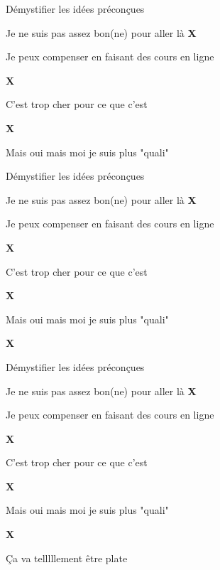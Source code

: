 \documentclass{beamer}
\begin{document}
\begin{frame}{Démystifier les idées préconçues}
\begin{itemize}
    \item Je ne suis pas assez bon(ne) pour aller là \Large{\textbf{\color{red}X}}
    \normalsize{\item Je peux compenser en faisant des cours en ligne} \Large{\textbf{\color{red}X}}
    \normalsize{\item C'est trop cher pour ce que c'est} \Large{\textbf{\color{red}X}}
    \normalsize{\item Mais oui mais moi je suis plus "quali"} %
\end{itemize}
\end{frame}

\begin{frame}{Démystifier les idées préconçues}
\begin{itemize}
    \item Je ne suis pas assez bon(ne) pour aller là \Large{\textbf{\color{red}X}}
    \normalsize{\item Je peux compenser en faisant des cours en ligne} \Large{\textbf{\color{red}X}}
    \normalsize{\item C'est trop cher pour ce que c'est} \Large{\textbf{\color{red}X}}
    \normalsize{\item Mais oui mais moi je suis plus "quali"} \Large{\textbf{\color{red}X}}
\end{itemize}
\end{frame}

\begin{frame}{Démystifier les idées préconçues}
\begin{itemize}
    \item Je ne suis pas assez bon(ne) pour aller là \Large{\textbf{\color{red}X}}
    \normalsize{\item Je peux compenser en faisant des cours en ligne} \Large{\textbf{\color{red}X}}
    \normalsize{\item C'est trop cher pour ce que c'est} \Large{\textbf{\color{red}X}}
    \normalsize{\item Mais oui mais moi je suis plus "quali"} \Large{\textbf{\color{red}X}}
     \normalsize{\item Ça va telllllement être plate} %
\end{itemize}
\end{frame}
\end{document}
